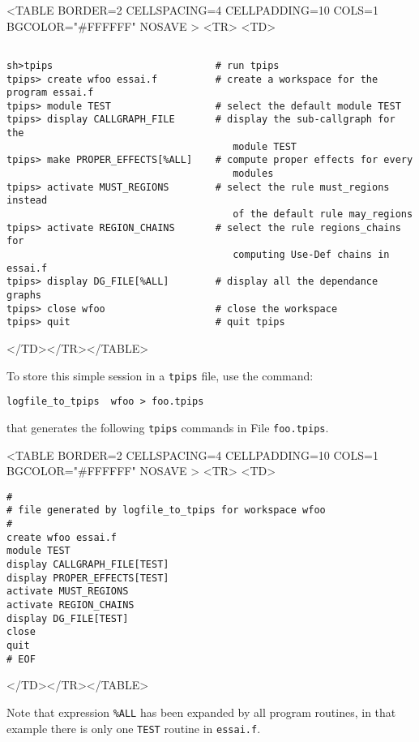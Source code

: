 \documentclass[a4paper,12pt]{article}
\begin{document}
\begin{rawhtml}
<TABLE BORDER=2 CELLSPACING=4 CELLPADDING=10 COLS=1  BGCOLOR="#FFFFFF" NOSAVE >
<TR>
<TD>
\end{rawhtml}
{\bf
\begin{verbatim}

sh>tpips                            # run tpips
tpips> create wfoo essai.f          # create a workspace for the program essai.f
tpips> module TEST                  # select the default module TEST
tpips> display CALLGRAPH_FILE       # display the sub-callgraph for the
                                       module TEST
tpips> make PROPER_EFFECTS[%ALL]    # compute proper effects for every
                                       modules
tpips> activate MUST_REGIONS        # select the rule must_regions instead
                                       of the default rule may_regions
tpips> activate REGION_CHAINS       # select the rule regions_chains for
                                       computing Use-Def chains in essai.f
tpips> display DG_FILE[%ALL]        # display all the dependance graphs
tpips> close wfoo                   # close the workspace
tpips> quit                         # quit tpips
\end{verbatim}
}
\begin{rawhtml}
</TD></TR></TABLE>
\end{rawhtml}

To store this simple session in a {\tt tpips} file, use the command:

\verb+logfile_to_tpips  wfoo > foo.tpips+

that generates the following {\tt tpips} commands  in File  \verb+foo.tpips+. 

\begin{rawhtml}
<TABLE BORDER=2 CELLSPACING=4 CELLPADDING=10 COLS=1 BGCOLOR="#FFFFFF" NOSAVE >
<TR>
<TD>
\end{rawhtml}
{\bf
\begin{verbatim}
#
# file generated by logfile_to_tpips for workspace wfoo
#
create wfoo essai.f
module TEST
display CALLGRAPH_FILE[TEST]
display PROPER_EFFECTS[TEST]
activate MUST_REGIONS
activate REGION_CHAINS
display DG_FILE[TEST]
close
quit
# EOF
\end{verbatim}
}
\begin{rawhtml}
</TD></TR></TABLE>
\end{rawhtml}

Note that  expression  \verb+%ALL+ has been expanded by all
program routines, in that example there is only one \verb+TEST+
routine in \verb+essai.f+.
\end{document}
